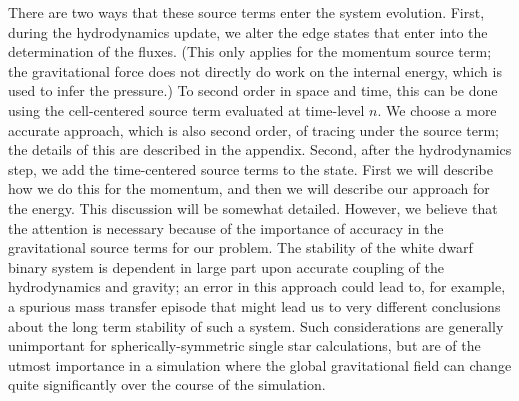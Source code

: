 \documentclass[iop]{../emulateapj}
\begin{document}
There are two ways that these source terms enter the system evolution. 
First, during the hydrodynamics update, we alter the edge states that enter
into the determination of the fluxes. (This only applies for the momentum source term;
the gravitational force does not directly do work on the internal energy, which is used 
to infer the pressure.) To second order in space and time, 
this can be done using the cell-centered
source term evaluated at time-level $n$. We choose a more accurate approach, 
which is also second order, of tracing
under the source term; the details of this are described in 
the appendix. Second, after the hydrodynamics step, we add the time-centered source terms
to the state. First we will describe how we do this for the momentum,
and then we will describe our approach for the energy. This discussion will be somewhat detailed.
However, we believe that the attention is necessary because of the importance of accuracy
in the gravitational source terms for our problem. The stability of the white dwarf binary
system is dependent in large part upon accurate coupling of the hydrodynamics and gravity;
an error in this approach could lead to, for example, a spurious mass transfer episode
that might lead us to very different conclusions about the long term stability of such a system.
Such considerations are generally unimportant for spherically-symmetric single star calculations,
but are of the utmost importance in a simulation where the global gravitational field can change 
quite significantly over the course of the simulation.
\end{document}
